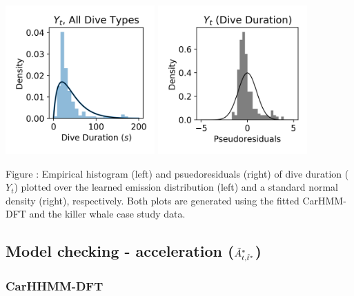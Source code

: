 \documentclass{article}
\begin{document}
        \begin{center}
        \includegraphics[width=2.25in]{../Plots/CarHMM_empirical_hist_dive_duration.png}
        \includegraphics[width=2.25in]{../Plots/CarHMM_psedoresids_Dive_Duration.png}
        \end{center}
        
        \noindent Figure : Empirical histogram (left) and psuedoresiduals (right) of dive duration ($Y_{t}$) plotted over the learned emission distribution (left) and a standard normal density (right), respectively. Both plots are generated using the fitted CarHMM-DFT and the killer whale case study data.
        \addtocounter{fignum}{1}
        
    \newpage
    \subsection{Model checking - acceleration ($\tilde{A}^*_{t,\tilde t^*}$)}
        
        \subsubsection{CarHHMM-DFT}
        
\end{document}
